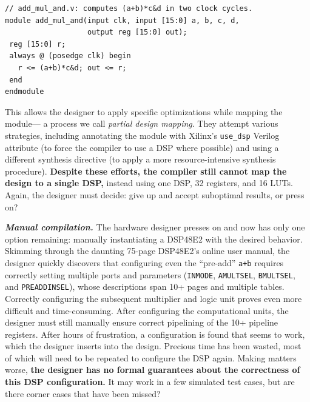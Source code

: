 \begin{verbatim}
// add_mul_and.v: computes (a+b)*c&d in two clock cycles.
module add_mul_and(input clk, input [15:0] a, b, c, d,
                   output reg [15:0] out);
 reg [15:0] r;
 always @ (posedge clk) begin
   r <= (a+b)*c&d; out <= r;
 end
endmodule
\end{verbatim}

\noindent
This allows the designer
  to  apply
  specific optimizations while mapping
  the module---%
  a process we call \textit{partial design mapping}.
They attempt various strategies,
  including
  annotating the module with
  Xilinx's \texttt{use\_dsp} Verilog attribute
  (to force the compiler to use a DSP where possible)
  and using a different
  synthesis directive
  (to apply a more 
  resource-intensive synthesis
  procedure).
\textbf{Despite these efforts,
  the compiler still cannot 
  map the design
  to a single DSP,}
  instead using one DSP, 
  32 registers, and 16 LUTs.
Again, the designer must decide:
  give up and accept
  suboptimal results,
  or press on?

\textit{\textbf{Manual compilation.}}
The hardware designer presses on and
  now has only one option remaining:
  manually instantiating a DSP48E2
  with the desired behavior.
Skimming through the daunting 75-page DSP48E2's online user manual,
  the designer quickly discovers that
  configuring even
  the ``pre-add'' \texttt{a+b}
  requires correctly setting 
  multiple ports and parameters
  (\texttt{INMODE}, \texttt{AMULTSEL}, \texttt{BMULTSEL}, and \texttt{PREADDINSEL}),
  whose descriptions span 10+ pages and multiple tables.
Correctly configuring the subsequent multiplier
  and logic unit proves even more difficult
  and time-consuming.
After configuring the computational units,
  the designer must still manually ensure
  correct pipelining
  of the 10+ pipeline registers.
After hours
  of frustration,
  a configuration is found that 
  seems to work, which the designer
  inserts into the design.
Precious time has been wasted,
  most of which will need to be repeated
  to configure the DSP again.
Making matters worse,
  \textbf{the designer has no formal guarantees
  about the correctness of this DSP configuration.}
It may work in a few simulated test cases,
  but are there corner cases
  that have been missed?\tighten


